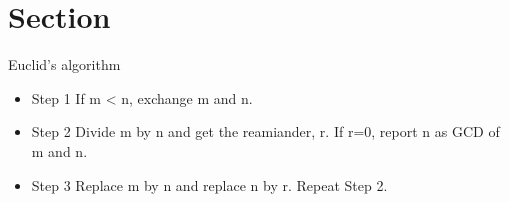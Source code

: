 \documentclass{article}
\begin{document}
\section{Section}
Euclid's algorithm
\begin{itemize}
\item Step 1 If m < n, exchange m and n.
\item Step 2 Divide m by n and get the reamiander, r. If r=0, report n as GCD of m and n.
\item Step 3 Replace m by n and replace n by r. Repeat Step 2.
\end{itemize}
\end{document}
